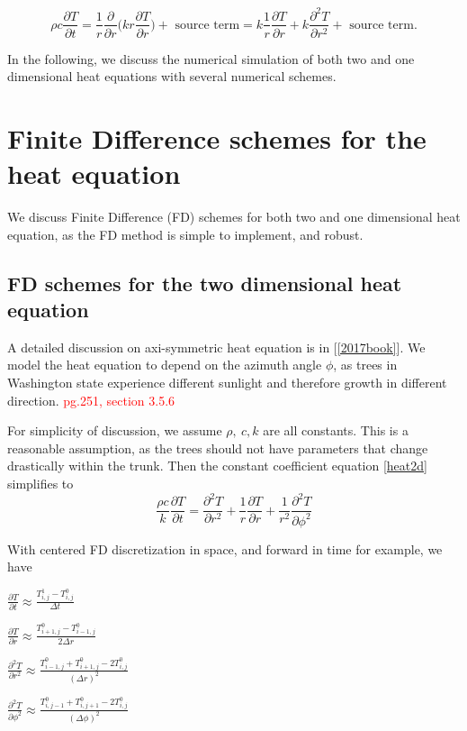 \documentclass[12pt]{article}
\begin{document}
\begin{equation}
\rho c\frac{\partial T}{\partial t}=\frac{1}{r}\frac{\partial}{\partial r}\bigg(kr\frac{\partial T}{\partial r}\bigg)+\text{ source term}=k\frac{1}{r}\frac{\partial T}{\partial r}+k\frac{\partial^2T}{\partial r^2}+\text{ source term}.\label{heat1d}
\end{equation}

In the following, we discuss the numerical simulation of both two and one dimensional heat equations with several numerical schemes. 



\section{Finite Difference schemes for the heat equation}
We discuss Finite Difference (FD) schemes for both two and one dimensional heat equation, as the FD method is simple to implement, and robust.  

\subsection{FD schemes for the two dimensional heat equation}
A detailed discussion on axi-symmetric heat equation is in [\ref{2017book}]. We model the heat equation to depend on the azimuth angle $\phi$, as trees in Washington state experience different sunlight and therefore growth in different direction. \textcolor{red}{pg.251, section 3.5.6}

For simplicity of discussion, we assume $\rho,\ c, k$ are all constants. This is a reasonable assumption, as the trees should not have parameters that change drastically within the trunk. Then the constant coefficient equation \eqref{heat2d} simplifies to 
\begin{equation}
\frac{\rho c}{k}\frac{\partial T}{\partial t}=\frac{\partial^2 T}{\partial r^2}+\frac{1}{r}\frac{\partial T}{\partial r}+\frac{1}{r^2}\frac{\partial^2 T}{\partial \phi^2}\label{simple_heat}
\end{equation}

With centered FD discretization in space, and forward in time for example, we have
\begin{itemize}\begin{multicols}{2}
\item $\frac{\partial T}{\partial t}\approx\frac{T^1_{i,j}-T^0_{i,j}}{\Delta t}$
\item $\frac{\partial T}{\partial r}\approx\frac{T^0_{i+1,j}-T^0_{i-1,j}}{2\Delta r}$
\item $\frac{\partial^2 T}{\partial r^2}\approx\frac{T^0_{i-1,j}+T^0_{i+1,j}-2T^0_{i,j}}{(\Delta r)^2}$
\item $\frac{\partial^2 T}{\partial \phi^2}\approx\frac{T^0_{i,j-1}+T^0_{i,j+1}-2T^0_{i,j}}{(\Delta \phi)^2}$
\end{multicols}\end{itemize}
\end{document}
